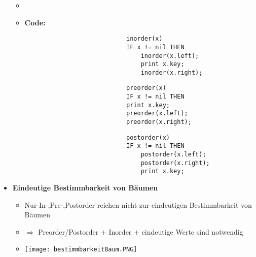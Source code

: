\begin{itemize}
\begin{itemize}
                    \item[]
                    \item[] \textbf{Code:} \\
                        \begin{minipage}[t]{0.3\textwidth}
                            \begin{verbatim}
                            inorder(x)
                            IF x != nil THEN 
                                inorder(x.left);
                                print x.key;
                                inorder(x.right);
                            \end{verbatim}
                        \end{minipage}
                        \begin{minipage}[t]{0.3\textwidth}
                            \begin{verbatim}
                            preorder(x)
                            IF x != nil THEN
                            print x.key;
                            preorder(x.left);
                            preorder(x.right);
                            \end{verbatim}
                        \end{minipage}
                        \begin{minipage}[t]{0.3\textwidth}
                            \begin{verbatim}
                            postorder(x)
                            IF x != nil THEN
                                postorder(x.left);
                                postorder(x.right);
                                print x.key;
                            \end{verbatim}
                        \end{minipage}
                \end{itemize}

            \item \textbf{Eindeutige Bestimmbarkeit von Bäumen}
                \begin{itemize}
                    \item Nur In-,Pre-,Postorder reichen nicht zur eindeutigen Bestimmbarkeit von Bäumen
                    \item[] $\Rightarrow$ Preorder/Postorder $+$ Inorder $+$ eindeutige Werte sind notwendig
                    \item[] \texttt{[image: bestimmbarkeitBaum.PNG]} 
                \end{itemize}


\end{itemize}
